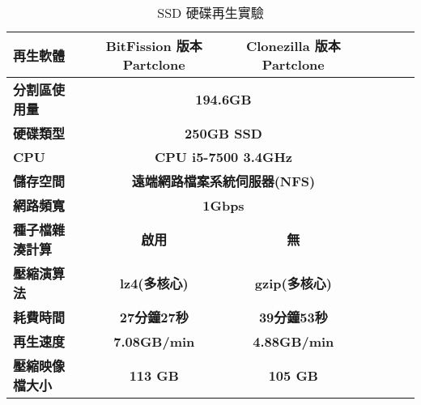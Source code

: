 \begin{table}[htbp]
\centering
\caption{SSD 硬碟再生實驗}
\label{imaging_ssd}
\begin{adjustbox}{max width=0.92\textwidth}
\begin{tabular}{lcccccc}

\toprule
\multicolumn{1}{l}{\textbf{再生軟體}} & \textbf{BitFission 版本 Partclone} & \textbf{Clonezilla 版本 Partclone} \\ \midrule
\multicolumn{1}{l}{\textbf{分割區使用量}} & \multicolumn{2}{c}{\textbf{194.6GB}} \\

\multicolumn{1}{l}{\textbf{硬碟類型}} & \multicolumn{2}{c}{\textbf{250GB SSD}} \\

\multicolumn{1}{l}{\textbf{CPU}} & \multicolumn{2}{c}{\textbf{CPU i5-7500 3.4GHz}} \\

\multicolumn{1}{l}{\textbf{儲存空間}} & \multicolumn{2}{c}{\textbf{遠端網路檔案系統伺服器(NFS)}} \\

\multicolumn{1}{l}{\textbf{網路頻寬}} & \multicolumn{2}{c}{\textbf{1Gbps}} \\

\multicolumn{1}{l}{\textbf{種子檔雜湊計算}} & \textbf{啟用} & \textbf{無} \\

\multicolumn{1}{l}{\textbf{壓縮演算法}} & \textbf{lz4(多核心)} & \textbf{gzip(多核心)} \\

\multicolumn{1}{l}{\textbf{耗費時間}} & \textbf{27分鐘27秒} & \textbf{39分鐘53秒} \\

\multicolumn{1}{l}{\textbf{再生速度}} & \textbf{7.08GB/min} & \textbf{4.88GB/min} \\

\multicolumn{1}{l}{\textbf{壓縮映像檔大小}} & \textbf{113 GB} & \textbf{105 GB} \\

\bottomrule
\end{tabular}
\end{adjustbox}
\end{table}
